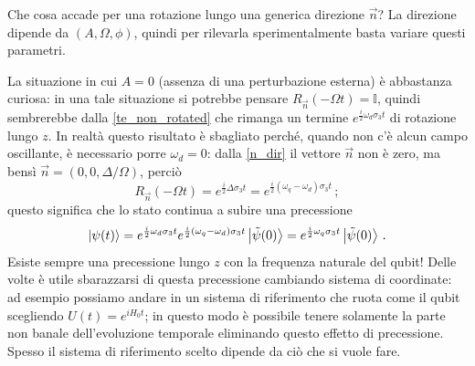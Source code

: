 \noindent Che cosa accade per una rotazione lungo una generica direzione $\vec n$? La direzione dipende da $(A, \Omega, \phi)$, quindi per rilevarla sperimentalmente basta variare questi parametri. 

\noindent La situazione in cui $A = 0$ (assenza di una perturbazione  esterna) è abbastanza curiosa: in una tale situazione si potrebbe pensare $R_{\vec n} (- \Omega t) = \mathbb{I}$, quindi sembrerebbe dalla \eqref{te_non_rotated} che rimanga un termine $e^{\frac{i}{2} \omega_d \sigma_3 t}$ di rotazione lungo $z$. In realtà questo risultato è sbagliato perché, quando non c'è alcun campo oscillante, è necessario porre $\omega_d = 0$: dalla \eqref{n_dir} il vettore $\vec n$ non è zero, ma bensì $\vec n = (0, 0, \Delta/\Omega)$, perciò
\begin{equation*}
    R_{\vec n} (-\Omega t) = e^{\frac{i}{2} \Delta \sigma_3 t} = e^{\frac{i}{2} (\omega_q - \omega_d) \sigma_3 t} \, ; 
\end{equation*}
questo significa che lo stato continua a subire una precessione
\begin{equation*}
    \ket{\psi(t)} = e^{\frac{i}{2} \omega_d \sigma_3 t} e^{\frac{i}{2} (\omega_q - \omega_d) \sigma_3 t} \ket{\tilde{\psi}(0)} = e^{\frac{i}{2} \omega_q \sigma_3 t} \ket{\tilde{\psi}(0)} \, .
\end{equation*}
Esiste sempre una precessione lungo $z$ con la frequenza naturale del qubit! Delle volte è utile sbarazzarsi di questa precessione cambiando sistema di coordinate: ad esempio possiamo andare in un sistema di riferimento che ruota come il qubit scegliendo $U(t) = e^{i H_0 t}$; in questo modo è possibile tenere solamente la parte non banale dell'evoluzione temporale eliminando questo effetto di precessione. Spesso il sistema di riferimento scelto dipende da ciò che si vuole fare. 

